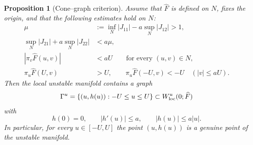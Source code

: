 \documentclass[11pt]{article}
\newtheorem{proposition}[theorem]{Proposition}
\newcommand{\Wu}{W^{u}}
\begin{document}
\begin{proposition}[Cone--graph criterion]\label{prop:graph}
Assume that $\widehat F$ is defined on $N$, fixes the origin, and that the
following estimates hold on $N$:
\begin{align}
 \mu
 &:=
 \inf_N |J_{11}|
 -a\sup_N|J_{12}|>1,
 \label{eq:cone1}\\
 \sup_N|J_{21}|+a\sup_N|J_{22}|
 &<
 a\mu,
 \label{eq:cone2}\\
 |\pi_v\widehat F(u,v)|
 &<aU
 \qquad\text{for every }(u,v)\in N,
 \label{eq:trap}\\
 \pi_u\widehat F(U,v)&>U,
 \qquad
 \pi_u\widehat F(-U,v)<-U
 \quad (|v|\le aU).
 \label{eq:exit}
\end{align}
Then the local unstable manifold contains a graph
\begin{equation}\label{eq:unstablegraph}
 \Gamma^u
 =
 \{(u,h(u)):-U\le u\le U\}
 \subset \Wu_{\rm loc}(0;\widehat F)
\end{equation}
with
\begin{equation}\label{eq:hslope}
 h(0)=0,\qquad
 |h'(u)|\le a,\qquad
 |h(u)|\le a|u|.
\end{equation}
In particular, for every $u\in[-U,U]$ the point $(u,h(u))$ is a
genuine point of the unstable manifold.
\end{proposition}
\end{document}
